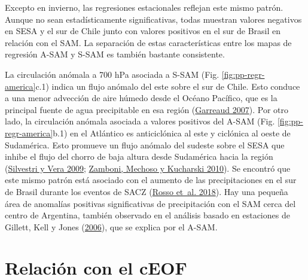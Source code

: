 \documentclass[12pt,oneside,a4paper]{reedthesis}
\begin{document}
Excepto en invierno, las regresiones estacionales reflejan este mismo patrón.
Aunque no sean estadísticamente significativas, todas muestran valores negativos en SESA y el sur de Chile junto con valores positivos en el sur de Brasil en relación con el SAM.
La separación de estas características entre los mapas de regresión A-SAM y S-SAM es también bastante consistente.

La circulación anómala a 700 hPa asociada a S-SAM (Fig. \ref{fig:pp-regr-america}c.1) indica un flujo anómalo del este sobre el sur de Chile.
Esto conduce a una menor advección de aire húmedo desde el Océano Pacífico, que es la principal fuente de agua precipitable en esa región (\protect\hyperlink{ref-garreaud2007}{Garreaud 2007}).
Por otro lado, la circulación anómala asociada a valores positivos del A-SAM (Fig. \ref{fig:pp-regr-america}b.1) en el Atlántico es anticiclónica al este y ciclónica al oeste de Sudamérica.
Esto promueve un flujo anómalo del sudeste sobre el SESA que inhibe el flujo del chorro de baja altura desde Sudamérica hacia la región (\protect\hyperlink{ref-silvestri2009}{Silvestri y Vera 2009}; \protect\hyperlink{ref-zamboni2010}{Zamboni, Mechoso y Kucharski 2010}).
Se encontró que este mismo patrón está asociado con el aumento de las precipitaciones en el sur de Brasil durante los eventos de SACZ (\protect\hyperlink{ref-rosso2018}{Rosso et~al. 2018}).
Hay una pequeña área de anomalías positivas significativas de precipitación con el SAM cerca del centro de Argentina, también observado en el análisis basado en estaciones de Gillett, Kell y Jones (\protect\hyperlink{ref-gillett2006}{2006}), que se explica por el A-SAM.

\hypertarget{sam-ceof}{%
\section{Relación con el cEOF}\label{sam-ceof}}
\end{document}
